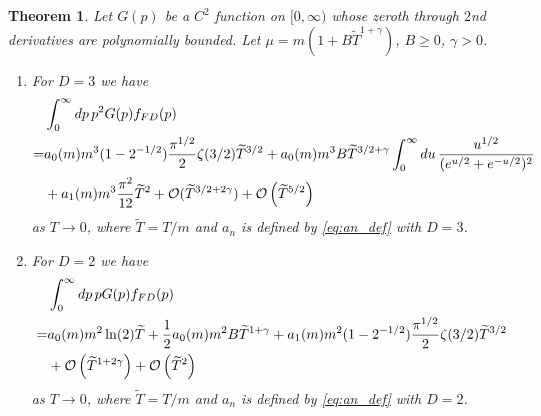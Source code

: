 \documentclass[sn-mathphys,Numbered]{sn-jnl}
\newtheorem{theorem}{Theorem}
\begin{document}
\begin{theorem}\label{thm:mu_zero_faster}
Let $G(p)$ be a $C^2$ function on $[0,\infty)$ whose zeroth through $2$nd derivatives are polynomially bounded.  Let $\mu=m(1+B\widetilde{T}^{1+\gamma})$, $B\geq 0$, $\gamma>0$. 
\begin{enumerate}
    \item For $D=3$ we have
\begin{align}
&\int_0^\infty dp\, p^{2} G(p) f_{FD}(p)\label{eq:FD_b_decay_orig_integral}\\
   =& a_0(m)m^{3}(1 - 2^{-1/2}) \frac{\pi^{1/2}}{2} \zeta(3/2)\widetilde{T}^{3/2}+ a_0(m)m^{3}B\widetilde{T}^{3/2+\gamma}\int_0^\infty du\,\frac{u^{1/2}}{(e^{u/2}+e^{-u/2})^2} \label{eq:asymp_FD_int_b_decay}\\
   &+a_1(m)m^{3} \frac{\pi^2}{12}\widetilde{T}^{2}+\mathcal{O}(\widetilde{T}^{3/2+2\gamma})+\mathcal{O}\left(\widetilde{T}^{5/2}\right)\notag
\end{align}
as $T\to 0$, where $\widetilde{T}=T/m$ and $a_n$ is defined by \eqref{eq:an_def} with $D=3$.
\item For $D=2$ we have
\begin{align}
&\int_0^\infty dp\, p G(p) f_{FD}(p)\\
   =& a_0(m)m^{2}\ln(2)\widetilde{T}+\frac{1}{2}a_0(m)m^{2}B\widetilde{T}^{1+\gamma}+a_1(m)m^{2}(1 - 2^{-1/2})  \frac{\pi^{1/2}}{2} \zeta(3/2)\widetilde{T}^{3/2}\label{eq:asymp_FD_int_b_decay_D2}\\
   &+\mathcal{O}\left(\widetilde{T}^{1+2\gamma}\right)+\mathcal{O}\left(\widetilde{T}^{2}\right)\notag
\end{align}
as $T\to 0$, where $\widetilde{T}=T/m$ and $a_n$ is defined by \eqref{eq:an_def} with $D=2$.
\end{enumerate}

\end{theorem}
\end{document}

